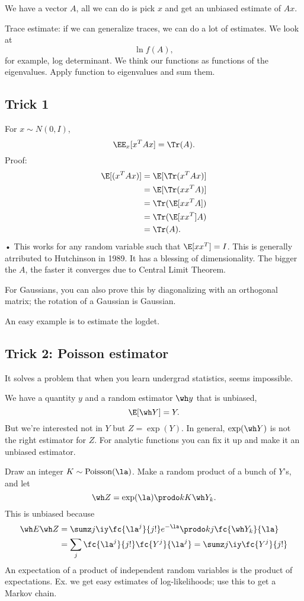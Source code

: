 We have a vector $A$, all we can do is  pick $x$ and get an unbiased estimate of $Ax$. 

Trace estimate: if we can generalize traces, we can do a lot of estimates. We look at 
$$
\ln f(A),
$$
for example, log determinant. We think our functions as functions of the eigenvalues. Apply function to eigenvalues and sum them.


\subsection{Trick 1}

For $x\sim N(0,I)$,
$$
\EE_x [x^TAx] = \Tr(A).
$$
Proof:
\begin{align}
\E[(x^TAx)] &= \E[\Tr(x^TAx)]\\
&= \E[\Tr(xx^TA)]\\
&=\Tr(\E[xx^T A])\\
&=\Tr(\E[xx^T] A)\\
&=\Tr (A).
\end{align}•
This works for any random variable such that $\E[xx^T]=I$.
This is generally atrributed to Hutchinson in 1989. It has a blessing of dimensionality. The bigger the $A$, the faster it converges due to Central Limit Theorem. 

For Gaussians, you can also prove this by diagonalizing with an orthogonal matrix; the rotation of a Gaussian is Gaussian.

An easy example is to estimate the logdet.

\subsection{Trick 2: Poisson estimator}
It solves a problem that when you learn undergrad statistics, seems impossible.

We have a quantity $y$ and a random estimator $\wh y$  that is unbiased,
$$
\E[\wh Y ] = Y.
$$
But we're interested not in $Y$ but $Z=\exp(Y)$. In general, $\exp(\wh Y)$ is not the right estimator for $Z$. For analytic functions you can fix it up and make it an unbiased estimator.

Draw an integer $K\sim \text{Poisson}(\la)$. Make a random product of a bunch of $Y$'s, and let 
$$\wh Z = \exp(\la)\prodo kK \wh Y_k.$$ 
This is unbiased because 
\begin{align}
\wh E\wh Z &= \sumz j\iy \fc{\la^j}{j!} e^{-\la} \prodo kj \fc{\wh Y_k}{\la}\\
&=\sum_j \fc{\la^j}{j!} \fc{Y^j}{\la^j} = \sumz j\iy  \fc{Y^j}{j!}
\end{align}
An expectation of a product of independent random variables is the product of expectations.
Ex. we get easy estimates of log-likelihoods; use this to get a Markov chain.

